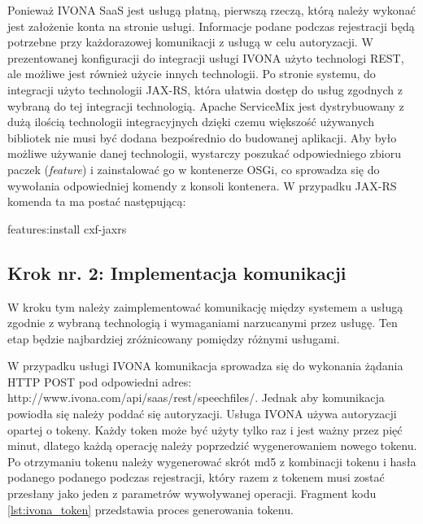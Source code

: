 Ponieważ IVONA SaaS jest usługą płatną, pierwszą rzeczą, którą należy wykonać jest założenie konta na stronie usługi. Informacje podane podczas rejestracji będą potrzebne przy każdorazowej komunikacji z usługą w celu autoryzacji. W prezentowanej konfiguracji do integracji usługi IVONA użyto technologi REST, ale możliwe jest również użycie innych technologii. Po stronie systemu, do integracji użyto technologii JAX-RS, która ułatwia dostęp do usług zgodnych z wybraną do tej integracji technologią. Apache ServiceMix jest dystrybuowany z dużą ilością technologii integracyjnych dzięki czemu większość używanych bibliotek nie musi być dodana bezpośrednio do budowanej aplikacji. Aby było możliwe używanie danej technologii, wystarczy poszukać odpowiedniego zbioru paczek (\textit{feature}) i zainstalować go w kontenerze OSGi, co sprowadza się do wywołania odpowiedniej komendy z konsoli kontenera. W przypadku JAX-RS komenda ta ma postać następującą: 
\begin{center}
features:install cxf-jaxrs
\end{center}

\subsection {Krok nr. 2: Implementacja komunikacji}

W kroku tym należy zaimplementować komunikację między systemem a usługą zgodnie z wybraną technologią i wymaganiami narzucanymi przez usługę. Ten etap będzie najbardziej zróżnicowany pomiędzy różnymi usługami.

W przypadku usługi IVONA komunikacja sprowadza się do wykonania żądania HTTP POST pod odpowiedni adres: http://www.ivona.com/api/saas/rest/speechfiles/. Jednak aby komunikacja powiodła się należy poddać się autoryzacji. Usługa IVONA używa autoryzacji opartej o tokeny. Każdy token może być użyty tylko raz i jest ważny przez pięć minut, dlatego każdą operację należy poprzedzić wygenerowaniem nowego tokenu. Po otrzymaniu tokenu należy wygenerować skrót md5 z kombinacji tokenu i hasła podanego podanego podczas rejestracji, który razem z tokenem musi zostać przesłany jako jeden z parametrów wywoływanej operacji. Fragment kodu \ref{lst:ivona_token} przedstawia proces generowania tokenu.

\lstset{language=Java, tabsize=4, caption=Proces generowania tokenu usługi IVONA,label=lst:ivona_token}


